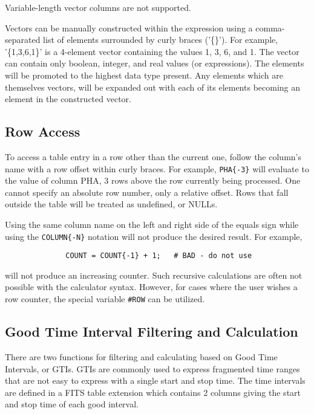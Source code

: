 \documentclass[11pt]{book}
\begin{document}
    Variable-length vector columns are not supported.

    Vectors can  be manually constructed  within the expression  using a
    comma-separated list of  elements surrounded by curly braces ('\{\}').
    For example, '\{1,3,6,1\}' is a 4-element vector containing the values
    1, 3, 6, and 1.  The  vector can contain  only boolean, integer, and
    real values (or expressions).  The elements will  be promoted to the
    highest  data type   present.  Any   elements   which  are themselves
    vectors, will be expanded out with  each of its elements becoming an
    element in the constructed vector.

\subsection{Row Access}

    To access a table entry in a row other  than the current one, follow
    the  column's name  with  a row  offset  within  curly  braces.  For
    example, \verb+PHA{-3}+ will evaluate to the value  of column PHA, 3 rows
    above  the  row currently  being processed.   One  cannot specify an
    absolute row number, only a relative offset.  Rows that fall outside
    the table will be treated as undefined, or NULLs.

    Using the same column name on the left and right side of the equals
    sign while using the \verb+COLUMN{-N}+ notation will not produce the desired
    result.  For example,
\begin{verbatim}
              COUNT = COUNT{-1} + 1;   # BAD - do not use
\end{verbatim}
    will not produce an increasing counter.  Such recursive
    calculations are often not possible with the calculator syntax.  
    However, for cases where the user wishes a row counter, the special 
    variable \verb+#ROW+ can be utilized.

\subsection{Good Time Interval Filtering and Calculation}

    There are two functions for filtering and calculating based
    on Good Time Intervals, or GTIs.  GTIs are commonly used to
    express fragmented time ranges that are not easy to express with a
    single start and stop time.  The time intervals are defined in a
    FITS table extension which contains 2 columns giving the
    start and stop time of each good interval.
\end{document}

